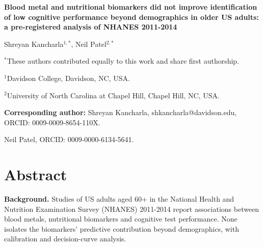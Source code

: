 \documentclass[12pt]{article}
\title{}
\date{}
\begin{document}
\linenumbers

\begin{singlespace}
\begin{center}
{\Large\bfseries Blood metal and nutritional biomarkers did not improve identification of low cognitive performance beyond demographics in older US adults: a pre-registered analysis of NHANES 2011-2014\par}
\end{center}

\bigskip

\begin{center}
Shreyan Kancharla$^{1,\ast}$, Neil Patel$^{2,\ast}$
\end{center}

\medskip

\noindent $^{\ast}$These authors contributed equally to this work and share first authorship.

\medskip

\noindent $^{1}$Davidson College, Davidson, NC, USA.

\noindent $^{2}$University of North Carolina at Chapel Hill, Chapel Hill, NC, USA.

\medskip

\noindent \textbf{Corresponding author:} Shreyan Kancharla, shkancharla@davidson.edu, ORCID: 0009-0009-8654-110X.

\noindent Neil Patel, ORCID: 0009-0000-6134-5641.

\end{singlespace}

\clearpage

\doublespacing
\section*{Abstract}

\textbf{Background.} Studies of US adults aged 60+ in the National Health and Nutrition Examination Survey (NHANES) 2011-2014 report associations between blood metals, nutritional biomarkers and cognitive test performance. None isolates the biomarkers' predictive contribution beyond demographics, with calibration and decision-curve analysis.
\end{document}
